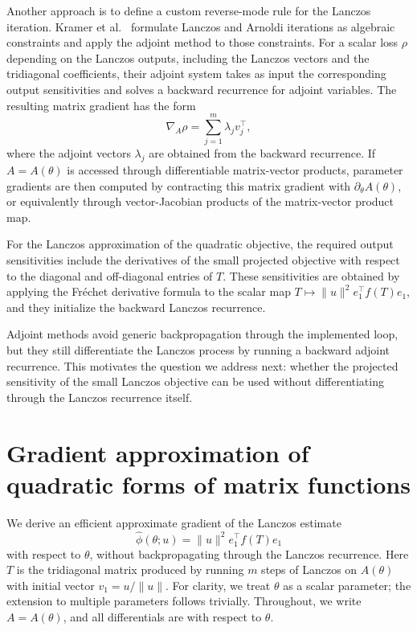 \documentclass{article}
\begin{document}
Another approach is to define a custom reverse-mode rule for the Lanczos iteration.
Kramer et al.~\citep{kramer2024gradients} formulate Lanczos and Arnoldi iterations as
algebraic constraints and apply the adjoint method to those constraints. For a scalar
loss $\rho$ depending on the Lanczos outputs, including the Lanczos vectors and the
tridiagonal coefficients, their adjoint system takes as input the corresponding output
sensitivities and solves a backward recurrence for adjoint variables. The resulting matrix
gradient has the form
\begin{equation}
    \nabla_A \rho
    =
    \sum_{j=1}^m \lambda_j v_j^\top ,
    \label{eq:bg_lanczos_adjoint_matrix_gradient}
\end{equation}
where the adjoint vectors $\lambda_j$ are obtained from the backward recurrence. If
$A=A(\theta)$ is accessed through differentiable matrix-vector products, parameter
gradients are then computed by contracting this matrix gradient with
$\partial_\theta A(\theta)$, or equivalently through vector-Jacobian products of the
matrix-vector product map.

For the Lanczos approximation
of the quadratic objective, the required output sensitivities include the
derivatives of the small projected objective with respect to the diagonal and
off-diagonal entries of $T$. These sensitivities are obtained by applying the
Fr\'echet derivative formula to the scalar map
$T\mapsto \|u\|^2 e_1^\top f(T)e_1$, and they initialize the backward Lanczos
recurrence.

Adjoint methods avoid generic backpropagation through the implemented loop, but they
still differentiate the Lanczos process by running a backward adjoint recurrence. This
motivates the question we address next: whether the projected sensitivity of the small
Lanczos objective can be used without differentiating through the Lanczos recurrence
itself.

\section{Gradient approximation of quadratic forms of matrix functions}
\label{sec:grad_approx}
We derive an efficient approximate gradient of the Lanczos estimate
\begin{equation}
    \widehat{\phi}(\theta;u)
    =
    \|u\|^2 e_1^\top f(T)e_1
    \label{eq:method_lanczos_quad}
\end{equation}
with respect to $\theta$, without backpropagating through the Lanczos recurrence.
Here $T$ is the tridiagonal matrix produced by running $m$ steps of Lanczos on
$A(\theta)$ with initial vector $v_1=u/\|u\|$. For clarity, we treat $\theta$ as a
scalar parameter; the extension to multiple parameters follows trivially. Throughout, we write $A=A(\theta)$, and all differentials are
with respect to $\theta$.
\end{document}
